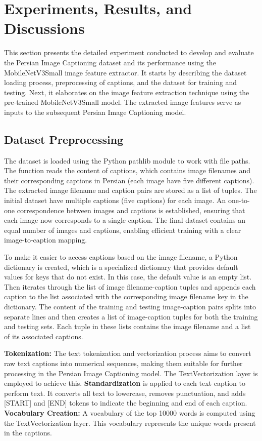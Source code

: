 \documentclass[runningheads]{llncs}
\begin{document}
\section{Experiments, Results, and Discussions}

This section presents the detailed experiment conducted to develop and evaluate the Persian Image Captioning dataset and its performance using the MobileNetV3Small image feature extractor. It starts by describing the dataset loading process, preprocessing of captions, and the dataset for training and testing. Next, it elaborates on the image feature extraction technique using the pre-trained MobileNetV3Small model. The extracted image features serve as inputs to the subsequent Persian Image Captioning model.

\subsection{Dataset Preprocessing}
The dataset is loaded using the Python pathlib module to work with file paths. The function reads the content of captions, which contains image filenames and their corresponding captions in Persian (each image have five different captions). The extracted image filename and caption pairs are stored as a list of tuples. The initial dataset have multiple captions (five captions) for each image. An one-to-one correspondence between images and captions is established, ensuring that each image now corresponds to a single caption. The final dataset contains an equal number of images and captions, enabling efficient training with a clear image-to-caption mapping.

To make it easier to access captions based on the image filename, a Python dictionary is created, which is a specialized dictionary that provides default values for keys that do not exist. In this case, the default value is an empty list. Then iterates through the list of image filename-caption tuples and appends each caption to the list associated with the corresponding image filename key in the dictionary. The content of the training and testing image-caption pairs splits into separate lines and then creates a list of image-caption tuples for both the training and testing sets. Each tuple in these lists contains the image filename and a list of its associated captions.

\textbf{Tokenization:}
The text tokenization and vectorization process aims to convert raw text captions into numerical sequences, making them suitable for further processing in the Persian Image Captioning model. The TextVectorization layer is employed to achieve this. \textbf{Standardization} is applied to each text caption to perform text. It converts all text to lowercase, removes punctuation, and adds [START] and [END] tokens to indicate the beginning and end of each caption.
\textbf{Vocabulary Creation:}
A vocabulary of the top 10000 words is computed using the TextVectorization layer. This vocabulary represents the unique words present in the captions.
\end{document}

